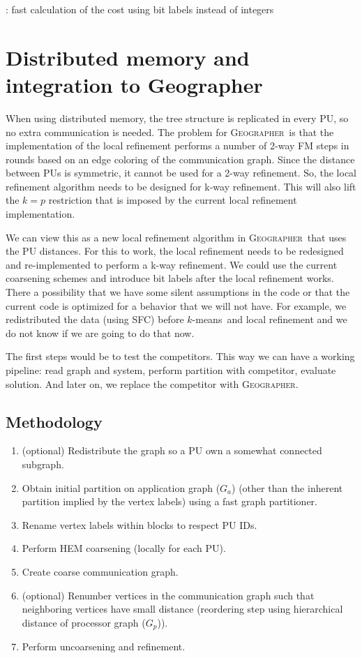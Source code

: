 \documentclass[a4paper,10pt]{article}
\newcommand{\red}[1]{{\color{red}{#1}}}
\newcommand{\km}{$k$-means}
\newcommand{\geo}{\textsc{Geographer}}
\newcommand{\todo}[1]{{\red{TODO}}: #1}
\begin{document}
\todo{fast calculation of the cost using bit labels instead of integers}


\section{Distributed memory and integration to Geographer}

When using distributed memory, the tree structure is replicated in every PU, so no extra 
communication is needed. The problem for \geo\ is that the implementation of the local refinement
performs a number of 2-way FM steps in rounds based on an edge coloring of the communication graph.
Since the distance between PUs is symmetric, it cannot be used
for a 2-way refinement. So, the local refinement algorithm needs to be designed for k-way refinement.
This will also lift the $k=p$ restriction that is imposed by the current local refinement implementation.


We can view this as a new local refinement algorithm in \geo\ that uses the PU distances.
For this to work, the local refinement needs to be redesigned and re-implemented to perform
a k-way refinement. We could use the current coarsening schemes and introduce bit labels
after the local refinement works. There a possibility that we have some silent assumptions
in the code or that the current code is optimized for a behavior that we will not have.
For example, we redistributed the data (using SFC) before \km\ and local refinement and
we do not know if we are going to do that now.

The first steps would be to test the competitors. This way we can have a working pipeline:
read graph and system, perform partition with competitor, evaluate solution.
And later on, we replace the competitor with \geo.


\subsection{Methodology}

\begin{enumerate}
\item (optional) Redistribute the graph so a PU own a somewhat connected subgraph.
\item Obtain initial partition on application graph ($G_a$) (other than the inherent partition implied
by the vertex labels) using a fast graph partitioner.
\item Rename vertex labels within blocks to respect PU IDs.
\item Perform HEM coarsening (locally for each PU).
\item Create coarse communication graph.
\item (optional) Renumber vertices in the communication graph such that neighboring vertices have 
small distance (reordering step using hierarchical distance of processor graph ($G_p$)).
\item Perform uncoarsening and refinement.
\end{enumerate}
\end{document}
